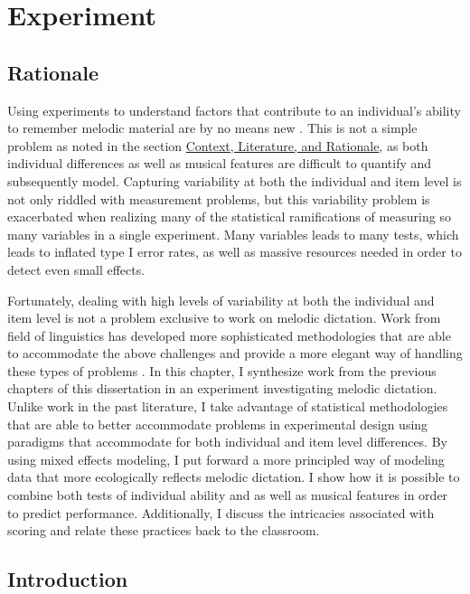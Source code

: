 \documentclass[12pt,]{book}
\begin{document}
\hypertarget{experiment}{%
\chapter{Experiment}\label{experiment}}

\hypertarget{rationale-4}{%
\section{Rationale}\label{rationale-4}}

Using experiments to understand factors that contribute to an individual's ability to remember melodic material are by no means new \citep{ortmannTonalDeterminantsMelodic1933}.
This is not a simple problem as noted in the section \protect\hyperlink{intro}{Context, Literature, and Rationale}, as both individual differences as well as musical features are difficult to quantify and subsequently model.
Capturing variability at both the individual and item level is not only riddled with measurement problems, but this variability problem is exacerbated when realizing many of the statistical ramifications of measuring so many variables in a single experiment.
Many variables leads to many tests, which leads to inflated type I error rates, as well as massive resources needed in order to detect even small effects.

Fortunately, dealing with high levels of variability at both the individual and item level is not a problem exclusive to work on melodic dictation.
Work from field of linguistics has developed more sophisticated methodologies that are able to accommodate the above challenges and provide a more elegant way of handling these types of problems \citep{baayenMixedeffectsModelingCrossed2008}.
In this chapter, I synthesize work from the previous chapters of this dissertation in an experiment investigating melodic dictation.
Unlike work in the past literature, I take advantage of statistical methodologies that are able to better accommodate problems in experimental design using paradigms that accommodate for both individual and item level differences.
By using mixed effects modeling, I put forward a more principled way of modeling data that more ecologically reflects melodic dictation.
I show how it is possible to combine both tests of individual ability and as well as musical features in order to predict performance.
Additionally, I discuss the intricacies associated with scoring and relate these practices back to the classroom.

\hypertarget{introduction}{%
\section{Introduction}\label{introduction}}
\end{document}
